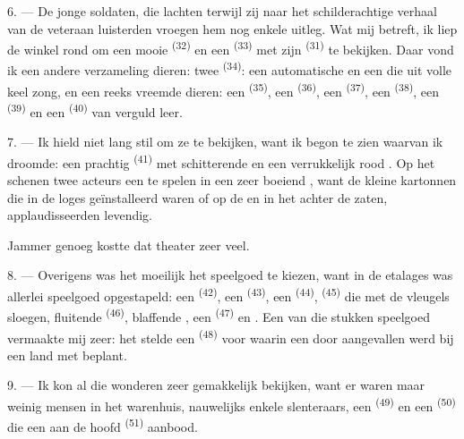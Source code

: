 6. --- De jonge soldaten, die lachten terwijl zij naar het schilderachtige verhaal van de
veteraan luisterden vroegen hem nog enkele uitleg. Wat mij betreft, ik liep de winkel rond om
een mooie  \textsuperscript{(32)} en een 
\textsuperscript{(33)} met zijn
 \textsuperscript{(31)} te bekijken. Daar vond ik een andere
verzameling dieren: twee  \textsuperscript{(34)}: een automatische
 en een  die uit volle keel zong, en een reeks vreemde
dieren: een  \textsuperscript{(35)}, een 
\textsuperscript{(36)}, een
 \textsuperscript{(37)}, een 
\textsuperscript{(38)}, een  \textsuperscript{(39)} en een
 \textsuperscript{(40)} van verguld leer.

7. --- Ik hield niet lang stil om ze te bekijken, want ik begon te zien waarvan ik droomde:
een prachtig  \textsuperscript{(41)} met schitterende  en
een verrukkelijk rood . Op het
 schenen twee acteurs een  te spelen in een zeer
boeiend , want de kleine kartonnen  die in de loges
geïnstalleerd waren of op de  en in het
 achter de  zaten, applaudisseerden levendig.

Jammer genoeg kostte dat theater zeer veel.

8. --- Overigens was het moeilijk het speelgoed te kiezen, want in de etalages was allerlei
speelgoed opgestapeld: een  \textsuperscript{(42)}, een 
\textsuperscript{(43)}, een
 \textsuperscript{(44)},  \textsuperscript{(45)}
die met de vleugels sloegen, fluitende  \textsuperscript{(46)}, blaffende
, een  \textsuperscript{(47)} en
. Een van die stukken speelgoed vermaakte mij zeer:
het stelde een  \textsuperscript{(48)} voor waarin een
 door  aangevallen werd bij een land met
 beplant.


9. --- Ik kon al die wonderen zeer gemakkelijk bekijken, want er waren maar weinig mensen in
het warenhuis, nauwelijks enkele slenteraars, een
 \textsuperscript{(49)} en een 
\textsuperscript{(50)} die een  aan de hoofd
\textsuperscript{(51)} aanbood.

